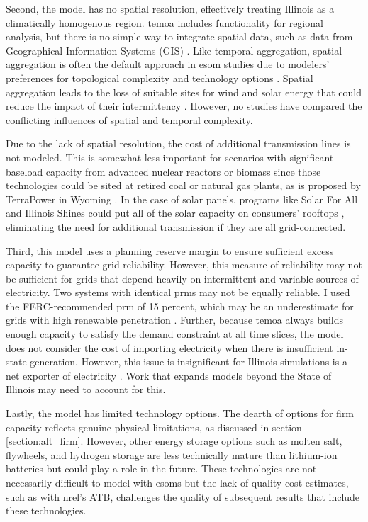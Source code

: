 Second, the model has no spatial resolution, effectively treating Illinois as a
climatically homogenous region. \gls{temoa} includes functionality for regional
analysis, but there is no simple way to integrate spatial data, such
as data from Geographical Information Systems (GIS) \cite{martinez-gordon_review_2021}.
Like temporal aggregation, spatial aggregation is often the default approach in
\gls{esom} studies due to modelers' preferences for topological complexity and
technology options \cite{martinez-gordon_review_2021,poncelet_impact_2016}. Spatial
aggregation leads to the loss of suitable sites for wind and solar energy that could
reduce the impact of their intermittency \cite{fleischer_minimising_2020}. However,
no studies have compared the conflicting influences of spatial and temporal complexity.

Due to the lack of spatial resolution, the cost of additional transmission lines
is not modeled. This is somewhat less important for scenarios with significant
baseload capacity from advanced nuclear reactors or biomass since those technologies
could be sited at retired coal or natural gas plants, as is proposed by TerraPower
in Wyoming \cite{associated_press_bill_2021}. In the case of solar panels, programs
like Solar For All and Illinois Shines \cite{chicago_illinois_nodate, noauthor_illinois_nodate}
could put all of the solar capacity on consumers' rooftops \cite{lopez_us_2012},
eliminating the need for additional transmission if they are all grid-connected.

Third, this model uses a planning reserve margin to ensure sufficient
excess capacity to guarantee grid reliability. However, this measure of reliability
may not be sufficient for grids that depend heavily on intermittent and variable
sources of electricity. Two systems with identical \glspl{prm} may not be equally
reliable. I used the FERC-recommended \gls{prm} of 15 percent, which may be
an underestimate for grids with high renewable penetration \cite{milligan_methods_2011}.
Further, because \gls{temoa} always builds enough capacity to satisfy the demand
constraint at all time slices, the model does not consider the cost of
importing electricity when there is insufficient in-state generation. However,
this issue is insignificant for Illinois simulations is a net exporter of electricity
\cite{energy_information_administration_eia_nodate}. Work that expands models beyond
the State of Illinois may need to account for this.

Lastly, the model has limited technology options. The dearth of options for
firm capacity reflects genuine physical limitations, as discussed in section
\ref{section:alt_firm}. However, other energy storage options such as
molten salt, flywheels, and hydrogen storage are less technically mature
than lithium-ion batteries but could play a role in the future. These technologies
are not necessarily difficult to model with \glspl{esom} but the lack of quality
cost estimates, such as with \gls{nrel}'s ATB, challenges the quality of subsequent
results that include these technologies.
